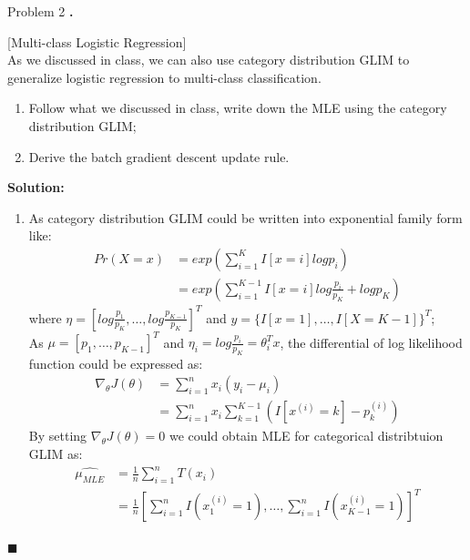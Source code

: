 \documentclass{article}
\newcounter{pcounter}                                   %
\newenvironment{problem}                                %
{                                                       %
    \color{gray}                                        %
    \stepcounter{pcounter}                              %
    \textbf{\arabic{pcounter}.}                         %
}{}                                                     %
\newenvironment{solution}                               %
{\textbf{Solution:} }{$\blacksquare$}                   %
\begin{document}
\begin{section}{Problem 2}
        \begin{problem}
            [Multi-class Logistic Regression]\\
            As we discussed in class, we can also use category distribution GLIM to generalize logistic regression to multi-class classification.
            \begin{enumerate}[label=(\alph*)]
                \item Follow what we discussed in class, write down the MLE using the category distribution GLIM;
                \item Derive the batch gradient descent update rule.
            \end{enumerate}
        \end{problem}

        \begin{solution}
            \begin{enumerate}[label=(\alph*)]
                \item As category distribution GLIM could be written into exponential family form like:
                \begin{align*}
                    Pr(X=x) &= exp(\sum_{i=1}^{K} I[x=i] log p_i) \\
                    &= exp(\sum_{i=1}^{K-1} I[x=i] log{\frac{p_i}{p_K}} + log{p_K})
                \end{align*}
                where $\eta = [log{\frac{p_1}{p_K}}, \dots, log{\frac{p_{K-1}}{p_K}}]^T$ and $y = \{I[x=1], \dots, I[X=K-1]\}^T$;\\
                As $\mu = [p_1, \dots, p_{K-1}]^T$ and $\eta_i = log{\frac{p_i}{p_K}} = \theta_i^T x$, the differential of log likelihood function could be expressed as:
                \begin{align*}
                    \nabla_\theta J(\theta) &= \sum_{i=1}^{n} x_i(y_i - \mu_i) \\
                    &= \sum_{i=1}^{n} x_i \sum_{k=1}^{K-1} (I[x^{(i)}=k] - p^{(i)}_k)
                \end{align*}
                By setting $\nabla_\theta J(\theta) = 0$ we could obtain MLE for categorical distribtuion GLIM as:
                \begin{align*}
                    \hat{\mu_{MLE}} &= \frac{1}{n} \sum_{i=1}^{n} T(x_i) \\
                    &= \frac{1}{n} [\sum_{i=1}^{n} I(x^{(i)}_1=1), \dots, \sum_{i=1}^{n} I(x^{(i)}_{K-1}=1)]^T
                \end{align*}
                

\end{enumerate}
\end{solution}
\end{section}
\end{document}
